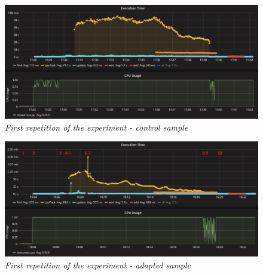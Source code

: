 \documentclass[12pt,a4paper]{article}
\begin{document}
\begin{figure}[!htb]
\centering
\includegraphics[width=1\textwidth]{1-ctrl}
\caption{\textit{First repetition of the experiment - control sample}} \label{figure:random:screen:control:1}
\end{figure}

\begin{figure}[!htb]
\centering
\includegraphics[width=1\textwidth]{1-adap}
\caption{\textit{First repetition of the experiment - adapted sample}} \label{figure:random:screen:adapted:1}
\end{figure}
\end{document}

